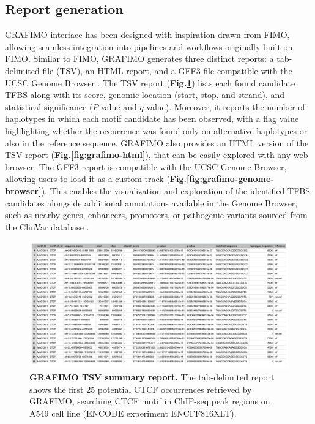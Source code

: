 \documentclass[a4paper, titlepage, openright]{book}
\newcommand{\grafimo}{GRAFIMO\xspace}
\begin{document}
\subsection{Report generation}
\grafimo interface has been designed with inspiration drawn from FIMO, allowing seamless integration into pipelines and workflows originally built on FIMO. Similar to FIMO, \grafimo generates three distinct reports: a tab-delimited file (TSV), an HTML report, and a GFF3 file compatible with the UCSC Genome Browser \citep{lee2020ucsc}. The TSV report (\textbf{Fig.\ref{fig:grafimo-tsv}}) lists each found candidate TFBS along with its score, genomic location (start, stop, and strand), and statistical significance ($P$-value and $q$-value). Moreover, it reports the number of haplotypes in which each motif candidate has been observed, with a flag value highlighting whether the occurrence was found only on alternative haplotypes or also in the reference sequence. \grafimo also provides an HTML version of the TSV report (\textbf{Fig.\ref{fig:grafimo-html}}), that can be easily explored with any web browser. The GFF3 report is compatible with the UCSC Genome Browser, allowing users to load it as a custom track (\textbf{Fig.\ref{fig:grafimo-genome-browser}}). This enables the visualization and exploration of the identified TFBS candidates alongside additional annotations available in the Genome Browser, such as nearby genes, enhancers, promoters, or pathogenic variants sourced from the ClinVar database \citep{landrum2020clinvar}.

\begin{figure}[!]
    \centering
    \includegraphics[width=\textwidth]{figures/grafimo-tsv-report.png}
    \caption[\grafimo TSV summary report]{\textbf{\grafimo TSV summary report.} The tab-delimited report shows the first 25 potential CTCF occurrences retrieved by \grafimo, searching CTCF motif in ChIP-seq peak regions on A549 cell line (ENCODE experiment ENCFF816XLT).}
    \label{fig:grafimo-tsv}
\end{figure}
\end{document}
